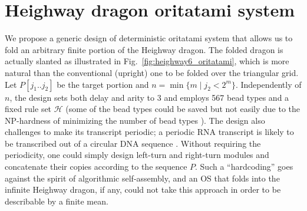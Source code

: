 	\section{Heighway dragon oritatami system}



We propose a generic design of deterministic oritatami system that allows us to fold an arbitrary finite portion of the Heighway dragon. 
The folded dragon is actually slanted as illustrated in Fig.~\ref{fig:heighway6_oritatami}, which is more natural than the conventional (upright) one to be folded over the triangular grid. 
Let $P[j_1 .. j_2]$ be the target portion and $n = \min\{m \mid j_2 < 2^m\}$. 
Independently of $n$, the design sets both delay and arity to 3 and employs 567 bead types and a fixed rule set $\mathcal{H}$ (some of the bead types could be saved but not easily due to the NP-hardness of minimizing the number of bead types \cite{HanKim2017}). 
The design also challenges to make its transcript periodic; a periodic RNA transcript is likely to be transcribed out of a circular DNA sequence \cite{GearyAndersen2014}. 
Without requiring the periodicity, one could simply design left-turn and right-turn modules and concatenate their copies according to the sequence $P$. 
Such a ``hardcoding'' goes against the spirit of algorithmic self-assembly, and an OS that folds into the infinite Heighway dragon, if any, could not take this approach in order to be describable by a finite mean. 



